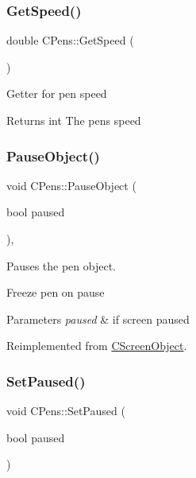 \subsubsection{\texorpdfstring{GetSpeed()}{GetSpeed()}}
{\footnotesize\ttfamily double C\+Pens\+::\+Get\+Speed (\begin{DoxyParamCaption}{ }\end{DoxyParamCaption})\hspace{0.3cm}{\ttfamily [inline]}}

Getter for pen speed \begin{DoxyReturn}{Returns}
int The pen\textquotesingle{}s speed 
\end{DoxyReturn}
\mbox{\label{class_c_pens_ac7f21709db467d9cb2c30f814d391edf}} 
\subsubsection{\texorpdfstring{PauseObject()}{PauseObject()}}
{\footnotesize\ttfamily void C\+Pens\+::\+Pause\+Object (\begin{DoxyParamCaption}\item[{bool}]{paused }\end{DoxyParamCaption})\hspace{0.3cm}{\ttfamily [override]}, {\ttfamily [virtual]}}



Pauses the pen object. 

Freeze pen on pause 
\begin{DoxyParams}{Parameters}
{\em paused} & if screen paused \\
\hline
\end{DoxyParams}


Reimplemented from \mbox{\hyperlink{class_c_screen_object_a584fe08e6bdd9efe0c2f06d6f1d53e70}{C\+Screen\+Object}}.

\mbox{\label{class_c_pens_ad028040c46be13e70983b497751c4741}} 
\subsubsection{\texorpdfstring{SetPaused()}{SetPaused()}}
{\footnotesize\ttfamily void C\+Pens\+::\+Set\+Paused (\begin{DoxyParamCaption}\item[{bool}]{paused }\end{DoxyParamCaption})\hspace{0.3cm}{\ttfamily [inline]}}

